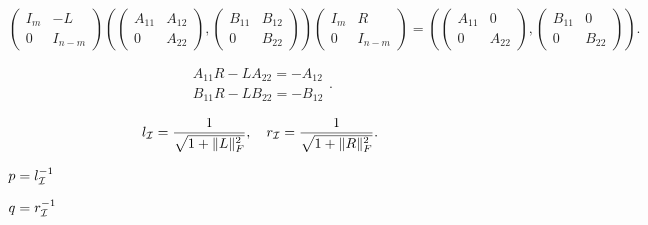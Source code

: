 {\newpage\clearpage
{}%
\begin{displaymath}
\left( \begin{array}{cc}  I_m & -L \\0  & I_{n - m} \end{array} \right) 
\left(
\left( \begin{array}{cc}  A_{11} & A_{12} \\0  & A_{22} \end{array} \right) ,
\left( \begin{array}{cc}  B_{11} & B_{12} \\0  & B_{22} \end{array} \right) 
\right)
\left( \begin{array}{cc}  I_m & R \\0  & I_{n - m} \end{array} \right) =
\left(
\left( \begin{array}{cc}  A_{11} & 0 \\0  & A_{22} \end{array} \right) ,
\left( \begin{array}{cc}  B_{11} & 0 \\0  & B_{22} \end{array} \right) 
\right).
\end{displaymath}%
\lthtmldisplayZ
\lthtmlcheckvsize\clearpage}

{\newpage\clearpage
{}%
\begin{displaymath}
\begin{array}{c}
A_{11}  R  - L   A_{22}  = - A_{12} \\
B_{11}  R  - L   B_{22}  = - B_{12}
\end{array}.
\end{displaymath}%
\lthtmldisplayZ
\lthtmlcheckvsize\clearpage}

{\newpage\clearpage
{}%
\begin{displaymath}
l_{\cal I} = \frac{1}{\sqrt{1 + \|L\|_F^2}}, \quad
r_{\cal I} = \frac{1}{\sqrt{1 + \|R\|_F^2}}.
\end{displaymath}%
\lthtmldisplayZ
\lthtmlcheckvsize\clearpage}

{\newpage\clearpage
{}%
$p = l^{-1}_{\cal I}$%
\lthtmlinlinemathZ
\lthtmlcheckvsize\clearpage}

{\newpage\clearpage
{}%
$q = r^{-1}_{\cal I}$%
\lthtmlinlinemathZ
\lthtmlcheckvsize\clearpage}


